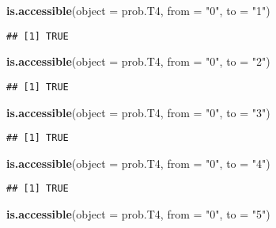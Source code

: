 \documentclass[
]{article}
\newenvironment{Shaded}{\begin{snugshade}}{\end{snugshade}}
\newcommand{\DataTypeTok}[1]{\textcolor[rgb]{0.13,0.29,0.53}{#1}}
\newcommand{\KeywordTok}[1]{\textcolor[rgb]{0.13,0.29,0.53}{\textbf{#1}}}
\newcommand{\NormalTok}[1]{#1}
\newcommand{\StringTok}[1]{\textcolor[rgb]{0.31,0.60,0.02}{#1}}
\begin{document}
\begin{Shaded}
\begin{Highlighting}[]
\KeywordTok{is.accessible}\NormalTok{(}\DataTypeTok{object =}\NormalTok{ prob.T4, }\DataTypeTok{from =} \StringTok{"0"}\NormalTok{, }\DataTypeTok{to =} \StringTok{"1"}\NormalTok{)}
\end{Highlighting}
\end{Shaded}

\begin{verbatim}
## [1] TRUE
\end{verbatim}

\begin{Shaded}
\begin{Highlighting}[]
\KeywordTok{is.accessible}\NormalTok{(}\DataTypeTok{object =}\NormalTok{ prob.T4, }\DataTypeTok{from =} \StringTok{"0"}\NormalTok{, }\DataTypeTok{to =} \StringTok{"2"}\NormalTok{)}
\end{Highlighting}
\end{Shaded}

\begin{verbatim}
## [1] TRUE
\end{verbatim}

\begin{Shaded}
\begin{Highlighting}[]
\KeywordTok{is.accessible}\NormalTok{(}\DataTypeTok{object =}\NormalTok{ prob.T4, }\DataTypeTok{from =} \StringTok{"0"}\NormalTok{, }\DataTypeTok{to =} \StringTok{"3"}\NormalTok{)}
\end{Highlighting}
\end{Shaded}

\begin{verbatim}
## [1] TRUE
\end{verbatim}

\begin{Shaded}
\begin{Highlighting}[]
\KeywordTok{is.accessible}\NormalTok{(}\DataTypeTok{object =}\NormalTok{ prob.T4, }\DataTypeTok{from =} \StringTok{"0"}\NormalTok{, }\DataTypeTok{to =} \StringTok{"4"}\NormalTok{)}
\end{Highlighting}
\end{Shaded}

\begin{verbatim}
## [1] TRUE
\end{verbatim}

\begin{Shaded}
\begin{Highlighting}[]
\KeywordTok{is.accessible}\NormalTok{(}\DataTypeTok{object =}\NormalTok{ prob.T4, }\DataTypeTok{from =} \StringTok{"0"}\NormalTok{, }\DataTypeTok{to =} \StringTok{"5"}\NormalTok{)}
\end{Highlighting}
\end{Shaded}
\end{document}
